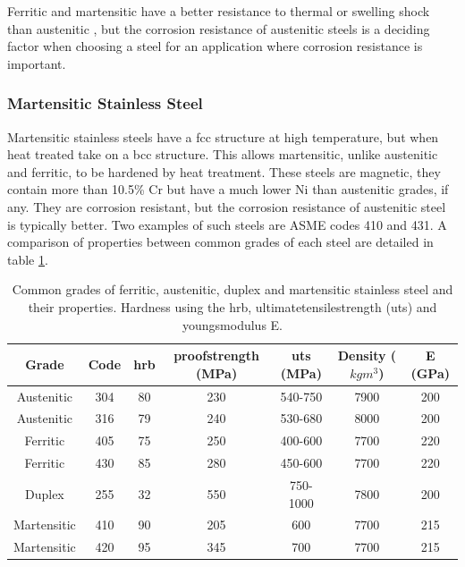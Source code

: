 Ferritic and martensitic have a better resistance to thermal or swelling shock than austenitic \cite{bccfenimodel}, but the corrosion resistance of austenitic steels is a deciding factor when choosing a steel for an application where corrosion resistance is important.



\subsubsection{Martensitic Stainless Steel}

Martensitic stainless steels have a \acrshort{fcc} structure at high temperature, but when heat treated take on a \acrshort{bcc}  structure.  This allows martensitic, unlike austenitic and ferritic, to be hardened by heat treatment.  These steels are magnetic, they contain more than 10.5\% Cr but have a much lower Ni than austenitic grades, if any.  They are corrosion resistant, but the corrosion resistance of austenitic steel is typically better.  Two examples of such steels are ASME codes 410 and 431.  A comparison of properties between common grades of each steel are detailed in table \ref{table:steelproperties}. 


\begin{table}[h]
\begin{center}
\begin{tabular}{c c c c c c c}
\hline\hline
Grade & Code & \acrshort{hrb} & \Gls{proofstrength} (MPa) & \acrshort{uts} (MPa) & Density ($kgm^3$) & E (GPa) \\
\hline\hline
Austenitic      & 304 & 80 & 230 & 540-750  & 7900 & 200 \\
Austenitic      & 316 & 79 & 240 & 530-680  & 8000 & 200 \\
Ferritic        & 405 & 75 & 250 & 400-600  & 7700 & 220 \\
Ferritic        & 430 & 85 & 280 & 450-600  & 7700 & 220 \\
Duplex          & 255 & 32 & 550 & 750-1000 & 7800 & 200 \\
Martensitic     & 410 & 90 & 205 & 600      & 7700 & 215 \\
Martensitic     & 420 & 95 & 345 & 700      & 7700 & 215 \\
\hline\hline
\end{tabular}
\end{center}
\caption{Common grades of ferritic, austenitic, duplex and martensitic stainless steel and their properties.  Hardness using the \acrshort{hrb}, \gls{ultimatetensilestrength} (\acrshort{uts}) and \Gls{youngsmodulus} E.}
\label{table:steelproperties}
\end{table}





